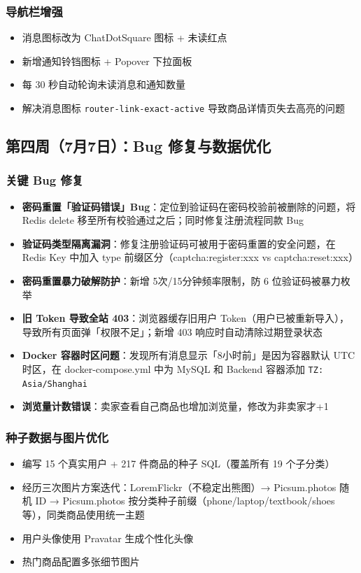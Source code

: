 \documentclass[12pt,a4paper]{ctexart}
\begin{document}
\subsubsection*{导航栏增强}
\begin{itemize}
    \item 消息图标改为 ChatDotSquare 图标 + 未读红点
    \item 新增通知铃铛图标 + Popover 下拉面板
    \item 每 30 秒自动轮询未读消息和通知数量
    \item 解决消息图标 \texttt{router-link-exact-active} 导致商品详情页失去高亮的问题
\end{itemize}

\subsection{第四周（7月7日）：Bug 修复与数据优化}

\subsubsection*{关键 Bug 修复}
\begin{itemize}
    \item \textbf{密码重置「验证码错误」Bug}：定位到验证码在密码校验前被删除的问题，将 Redis delete 移至所有校验通过之后；同时修复注册流程同款 Bug
    \item \textbf{验证码类型隔离漏洞}：修复注册验证码可被用于密码重置的安全问题，在 Redis Key 中加入 type 前缀区分（captcha:register:xxx vs captcha:reset:xxx）
    \item \textbf{密码重置暴力破解防护}：新增 5次/15分钟频率限制，防 6 位验证码被暴力枚举
    \item \textbf{旧 Token 导致全站 403}：浏览器缓存旧用户 Token（用户已被重新导入），导致所有页面弹「权限不足」；新增 403 响应时自动清除过期登录状态
    \item \textbf{Docker 容器时区问题}：发现所有消息显示「8小时前」是因为容器默认 UTC 时区，在 docker-compose.yml 中为 MySQL 和 Backend 容器添加 \texttt{TZ: Asia/Shanghai}
    \item \textbf{浏览量计数错误}：卖家查看自己商品也增加浏览量，修改为非卖家才+1
\end{itemize}

\subsubsection*{种子数据与图片优化}
\begin{itemize}
    \item 编写 15 个真实用户 + 217 件商品的种子 SQL（覆盖所有 19 个子分类）
    \item 经历三次图片方案迭代：LoremFlickr（不稳定出熊图）→ Picsum.photos 随机 ID → Picsum.photos 按分类种子前缀（phone/laptop/textbook/shoes 等），同类商品使用统一主题
    \item 用户头像使用 Pravatar 生成个性化头像
    \item 热门商品配置多张细节图片
\end{itemize}
\end{document}
